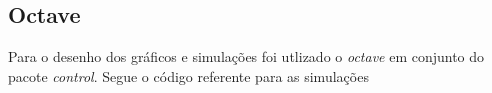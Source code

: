 \documentclass[a4paper,11pt]{article}
\begin{document}
\inputminted[xleftmargin=15pt,linenos,frame=single,framesep=5pt]{python}{../python/exsim1.py}

\subsection{Octave}

Para o desenho dos gráficos e simulações foi utlizado o \textit{octave} em conjunto do pacote \textit{control}. Segue o código referente para as simulações

\inputminted[xleftmargin=15pt,linenos,frame=single,framesep=5pt]{matlab}{../matlab/exsim1.m}


\end{document}
